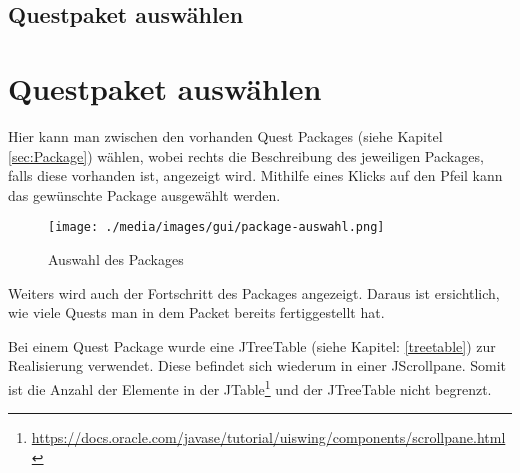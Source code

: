 \iffabian
	\subsection{Questpaket auswählen}
	\label{sec:gui-elements-package-sel}
\else
	\section{Questpaket auswählen}
	\label{sec:gui-elements-package-sel}
\fi
Hier kann man zwischen den vorhanden Quest Packages (siehe Kapitel \ref{sec:Package}) wählen, wobei rechts die Beschreibung des jeweiligen Packages, falls diese vorhanden ist, angezeigt wird. Mithilfe eines Klicks auf den Pfeil kann das gewünschte Package ausgewählt werden.

\begin{figure}[h] 
  \centering
     \texttt{[image: ./media/images/gui/package-auswahl.png]}
  \caption{Auswahl des Packages}
  \label{fig:Package_Auswahl}
\end{figure}

Weiters wird auch der Fortschritt des Packages angezeigt. Daraus ist ersichtlich, wie viele Quests man in dem Packet bereits fertiggestellt hat.

Bei einem Quest Package wurde eine JTreeTable (siehe Kapitel: \ref{treetable}) zur Realisierung verwendet. Diese befindet sich wiederum in einer JScrollpane. Somit ist die Anzahl der Elemente in der JTable\footnote{\url{https://docs.oracle.com/javase/tutorial/uiswing/components/scrollpane.html}}  und der JTreeTable nicht begrenzt.
